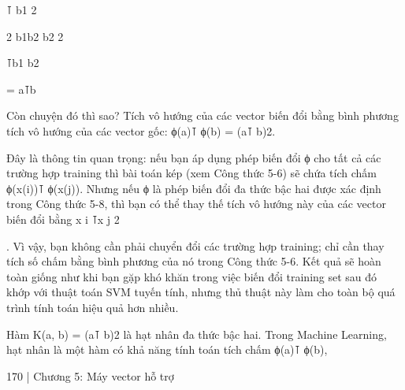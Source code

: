 ⊺ b1 2

2 b1b2 b2 2

⊺b1 b2

= a⊺b

Còn chuyện đó thì sao? Tích vô hướng của các vector biến đổi bằng bình phương tích vô hướng của các vector gốc: ϕ(a)⊺ ϕ(b) = (a⊺ b)2.

Đây là thông tin quan trọng: nếu bạn áp dụng phép biến đổi ϕ cho tất cả các trường hợp training thì bài toán kép (xem Công thức 5-6) sẽ chứa tích chấm ϕ(x(i))⊺ ϕ(x(j)). Nhưng nếu ϕ là phép biến đổi đa thức bậc hai được xác định trong Công thức 5-8, thì bạn có thể thay thế tích vô hướng này của các vector biến đổi bằng x i ⊺x j 2

. Vì vậy, bạn không cần phải chuyển đổi các trường hợp training; chỉ cần thay tích số chấm bằng bình phương của nó trong Công thức 5-6. Kết quả sẽ hoàn toàn giống như khi bạn gặp khó khăn trong việc biến đổi training set sau đó khớp với thuật toán SVM tuyến tính, nhưng thủ thuật này làm cho toàn bộ quá trình tính toán hiệu quả hơn nhiều.

Hàm K(a, b) = (a⊺ b)2 là hạt nhân đa thức bậc hai. Trong Machine Learning, hạt nhân là một hàm có khả năng tính toán tích chấm ϕ(a)⊺ ϕ(b),

170 | Chương 5: Máy vector hỗ trợ

